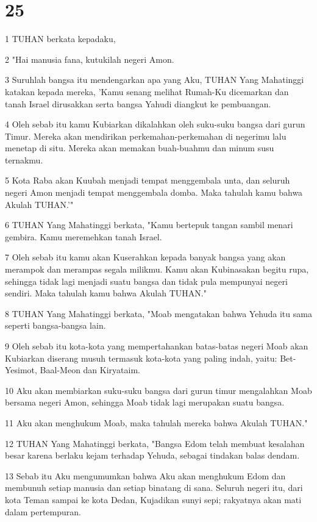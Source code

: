 \chapter{25}

\par 1 TUHAN berkata kepadaku,
\par 2 "Hai manusia fana, kutukilah negeri Amon.
\par 3 Suruhlah bangsa itu mendengarkan apa yang Aku, TUHAN Yang Mahatinggi katakan kepada mereka, 'Kamu senang melihat Rumah-Ku dicemarkan dan tanah Israel dirusakkan serta bangsa Yahudi diangkut ke pembuangan.
\par 4 Oleh sebab itu kamu Kubiarkan dikalahkan oleh suku-suku bangsa dari gurun Timur. Mereka akan mendirikan perkemahan-perkemahan di negerimu lalu menetap di situ. Mereka akan memakan buah-buahmu dan minum susu ternakmu.
\par 5 Kota Raba akan Kuubah menjadi tempat menggembala unta, dan seluruh negeri Amon menjadi tempat menggembala domba. Maka tahulah kamu bahwa Akulah TUHAN.'"
\par 6 TUHAN Yang Mahatinggi berkata, "Kamu bertepuk tangan sambil menari gembira. Kamu meremehkan tanah Israel.
\par 7 Oleh sebab itu kamu akan Kuserahkan kepada banyak bangsa yang akan merampok dan merampas segala milikmu. Kamu akan Kubinasakan begitu rupa, sehingga tidak lagi menjadi suatu bangsa dan tidak pula mempunyai negeri sendiri. Maka tahulah kamu bahwa Akulah TUHAN."
\par 8 TUHAN Yang Mahatinggi berkata, "Moab mengatakan bahwa Yehuda itu sama seperti bangsa-bangsa lain.
\par 9 Oleh sebab itu kota-kota yang mempertahankan batas-batas negeri Moab akan Kubiarkan diserang musuh termasuk kota-kota yang paling indah, yaitu: Bet-Yesimot, Baal-Meon dan Kiryataim.
\par 10 Aku akan membiarkan suku-suku bangsa dari gurun timur mengalahkan Moab bersama negeri Amon, sehingga Moab tidak lagi merupakan suatu bangsa.
\par 11 Aku akan menghukum Moab, maka tahulah mereka bahwa Akulah TUHAN."
\par 12 TUHAN Yang Mahatinggi berkata, "Bangsa Edom telah membuat kesalahan besar karena berlaku kejam terhadap Yehuda, sebagai tindakan balas dendam.
\par 13 Sebab itu Aku mengumumkan bahwa Aku akan menghukum Edom dan membunuh setiap manusia dan setiap binatang di sana. Seluruh negeri itu, dari kota Teman sampai ke kota Dedan, Kujadikan sunyi sepi; rakyatnya akan mati dalam pertempuran.
